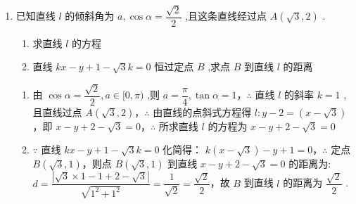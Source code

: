 \begin{enumerate}
    
    \begin{jieda}
    \end{jieda}
    
    \item 已知直线 $l$ 的倾斜角为 $a,\cos \alpha  = \dfrac{\sqrt{2}}{2}$ ,且这条直线经过点 $A\left( {\sqrt{3},2}\right)$ .
    \begin{enumerate}
        \item 求直线 $l$ 的方程
        \item 直线 ${kx} - y + 1 - \sqrt{3}k = 0$ 恒过定点 $B$ ,求点 $B$ 到直线 $l$ 的距离
    \end{enumerate}
    \begin{jieda}
        \begin{enumerate}
            \item 由 $\cos \alpha  = \dfrac{\sqrt{2}}{2},a \in  \lbrack 0,\pi )$ ,则 $a = \dfrac{\pi }{4},\tan \alpha  = 1$，$\therefore$ 直线 $l$ 的斜率 $k = 1$ ,且直线过点 $A\left( {\sqrt{3},2}\right)$，$\therefore$ 由直线的点斜式方程得 $l : y - 2 = \left( {x - \sqrt{3}}\right)$，即 $x - y + 2 - \sqrt{3} = 0$，$\therefore$ 所求直线 $l$ 的方程为 $x - y + 2 - \sqrt{3} = 0$
            
            \item $\because$ 直线 ${kx} - y + 1 - \sqrt{3}k = 0$ 化简得： $k\left( {x - \sqrt{3}}\right)  - y + 1 = 0$，$\therefore$ 定点 $B\left( {\sqrt{3},1}\right)$，则点 $B\left( {\sqrt{3},1}\right)$ 到直线 $x - y + 2 - \sqrt{3} = 0$ 的距离为:$d = \dfrac{\left| \sqrt{3} \times  1 - 1 + 2 - \sqrt{3}\right| }{\sqrt{{1}^{2} + {1}^{2}}} = \dfrac{1}{\sqrt{2}} = \dfrac{\sqrt{2}}{2}$，故 $B$ 到直线 $l$ 的距离为 $\dfrac{\sqrt{2}}{2}$ .
        \end{enumerate}
    \end{jieda}
    

\end{enumerate}
